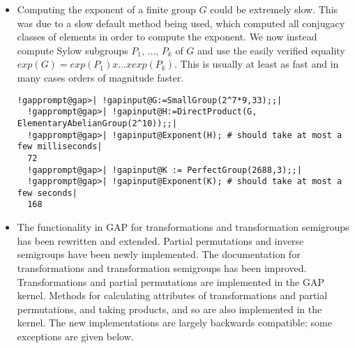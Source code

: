 \documentclass[a4paper,11pt]{report}
\begin{document}
{{{\begin{itemize}
\item  Computing the exponent of a finite group $G$ could be extremely slow. This was due to a slow default method being used,
which computed all conjugacy classes of elements in order to compute the
exponent. We now instead compute Sylow subgroups $P_1$, ..., $P_k$ of $G$ and use the easily verified equality $exp(G) = exp(P_1) x ... x exp(P_k)$. This is usually at least as fast and in many cases orders of magnitude
faster. 
\begin{Verbatim}[commandchars=!@|,fontsize=\small,frame=single,label=Example]
  !gapprompt@gap>| !gapinput@G:=SmallGroup(2^7*9,33);;|
  !gapprompt@gap>| !gapinput@H:=DirectProduct(G, ElementaryAbelianGroup(2^10));;|
  !gapprompt@gap>| !gapinput@Exponent(H); # should take at most a few milliseconds|
  72
  !gapprompt@gap>| !gapinput@K := PerfectGroup(2688,3);;|
  !gapprompt@gap>| !gapinput@Exponent(K); # should take at most a few seconds|
  168
\end{Verbatim}
 
\item   The functionality in \textsf{GAP} for transformations and transformation semigroups has been rewritten and
extended. Partial permutations and inverse semigroups have been newly
implemented. The documentation for transformations and transformation
semigroups has been improved. Transformations and partial permutations are
implemented in the \textsf{GAP} kernel. Methods for calculating attributes of transformations and partial
permutations, and taking products, and so are also implemented in the kernel.
The new implementations are largely backwards compatible; some exceptions are
given below. 


\end{itemize}}}}
\end{document}
